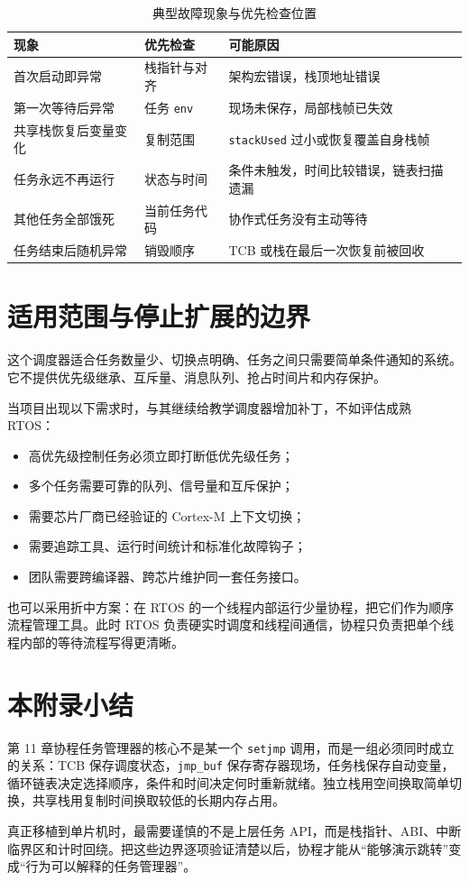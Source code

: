 \begin{table}[htbp]
\centering
\caption{典型故障现象与优先检查位置} \label{tab:app-coro-faults}
\begin{tabularx}{\textwidth}{llX}
\toprule
现象 & 优先检查 & 可能原因 \\
\midrule
首次启动即异常 & 栈指针与对齐 & 架构宏错误，栈顶地址错误 \\
第一次等待后异常 & 任务 \texttt{env} & 现场未保存，局部栈帧已失效 \\
共享栈恢复后变量变化 & 复制范围 & \texttt{stackUsed} 过小或恢复覆盖自身栈帧 \\
任务永远不再运行 & 状态与时间 & 条件未触发，时间比较错误，链表扫描遗漏 \\
其他任务全部饿死 & 当前任务代码 & 协作式任务没有主动等待 \\
任务结束后随机异常 & 销毁顺序 & TCB 或栈在最后一次恢复前被回收 \\
\bottomrule
\end{tabularx}
\end{table}

\section{适用范围与停止扩展的边界}

这个调度器适合任务数量少、切换点明确、任务之间只需要简单条件通知的系统。它不提供优先级继承、互斥量、消息队列、抢占时间片和内存保护。

当项目出现以下需求时，与其继续给教学调度器增加补丁，不如评估成熟 RTOS：

\begin{itemize}
\item 高优先级控制任务必须立即打断低优先级任务；
\item 多个任务需要可靠的队列、信号量和互斥保护；
\item 需要芯片厂商已经验证的 Cortex-M 上下文切换；
\item 需要追踪工具、运行时间统计和标准化故障钩子；
\item 团队需要跨编译器、跨芯片维护同一套任务接口。
\end{itemize}

也可以采用折中方案：在 RTOS 的一个线程内部运行少量协程，把它们作为顺序流程管理工具。此时 RTOS 负责硬实时调度和线程间通信，协程只负责把单个线程内部的等待流程写得更清晰。

\section{本附录小结}

第 11 章协程任务管理器的核心不是某一个 \texttt{setjmp} 调用，而是一组必须同时成立的关系：TCB 保存调度状态，\texttt{jmp\_buf} 保存寄存器现场，任务栈保存自动变量，循环链表决定选择顺序，条件和时间决定何时重新就绪。独立栈用空间换取简单切换，共享栈用复制时间换取较低的长期内存占用。

真正移植到单片机时，最需要谨慎的不是上层任务 API，而是栈指针、ABI、中断临界区和计时回绕。把这些边界逐项验证清楚以后，协程才能从“能够演示跳转”变成“行为可以解释的任务管理器”。
